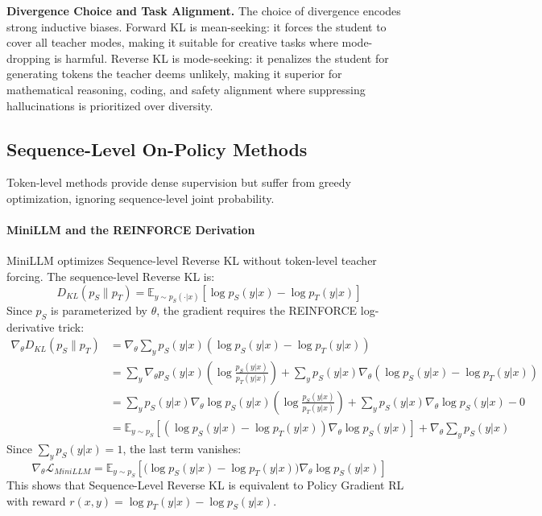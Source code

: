 \documentclass{article} %
\begin{document}
\textbf{Divergence Choice and Task Alignment.} The choice of divergence encodes strong inductive biases. Forward KL is mean-seeking: it forces the student to cover all teacher modes, making it suitable for creative tasks where mode-dropping is harmful. Reverse KL is mode-seeking: it penalizes the student for generating tokens the teacher deems unlikely, making it superior for mathematical reasoning, coding, and safety alignment where suppressing hallucinations is prioritized over diversity.

\subsection{Sequence-Level On-Policy Methods}
\label{subsec:sequence_level}

Token-level methods provide dense supervision but suffer from greedy optimization, ignoring sequence-level joint probability.

\paragraph{MiniLLM and the REINFORCE Derivation}
MiniLLM \citep{2306.08543} optimizes Sequence-level Reverse KL without token-level teacher forcing.
The sequence-level Reverse KL is:
\begin{equation}
    D_{KL}(p_S \parallel p_T) = \mathbb{E}_{y \sim p_S(\cdot|x)} \left[ \log p_S(y|x) - \log p_T(y|x) \right]
\end{equation}
Since $p_S$ is parameterized by $\theta$, the gradient requires the REINFORCE log-derivative trick:
\begin{align}
    \nabla_\theta D_{KL}(p_S \parallel p_T) &= \nabla_\theta \sum_y p_S(y|x) \left( \log p_S(y|x) - \log p_T(y|x) \right) \nonumber \\
    &= \sum_y \nabla_\theta p_S(y|x) \left( \log \frac{p_S(y|x)}{p_T(y|x)} \right) + \sum_y p_S(y|x) \nabla_\theta \left( \log p_S(y|x) - \log p_T(y|x) \right) \nonumber \\
    &= \sum_y p_S(y|x) \nabla_\theta \log p_S(y|x) \left( \log \frac{p_S(y|x)}{p_T(y|x)} \right) + \sum_y p_S(y|x) \nabla_\theta \log p_S(y|x) - 0 \nonumber \\
    &= \mathbb{E}_{y \sim p_S} \left[ \left( \log p_S(y|x) - \log p_T(y|x) \right) \nabla_\theta \log p_S(y|x) \right] + \nabla_\theta \sum_y p_S(y|x)
\end{align}
Since $\sum_y p_S(y|x) = 1$, the last term vanishes:
\begin{equation}
    \nabla_\theta \mathcal{L}_{MiniLLM} = \mathbb{E}_{y \sim p_S} \left[ \Big( \log p_S(y|x) - \log p_T(y|x) \Big) \nabla_\theta \log p_S(y|x) \right]
    \label{eq:minillm_final}
\end{equation}
This shows that Sequence-Level Reverse KL is equivalent to Policy Gradient RL with reward $r(x, y) = \log p_T(y|x) - \log p_S(y|x)$.
\end{document}
